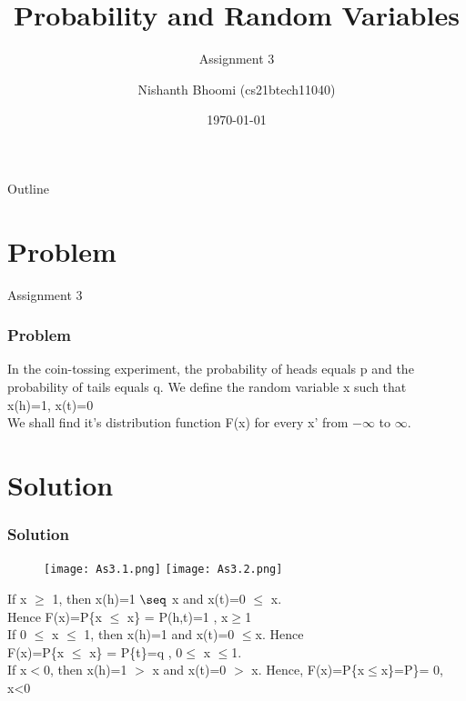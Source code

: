 \documentclass{beamer}
\title{Probability and Random Variables}
\subtitle{Assignment 3}
\author{Nishanth Bhoomi (cs21btech11040)}
\date{\today}
\begin{document}
\begin{frame}
    \titlepage 
\end{frame}

\begin{frame}{Outline}
    \tableofcontents
\end{frame}

\section{Problem}

\begin{frame}{Assignment 3}
  \frametitle{Problem}
 In the coin-tossing experiment, the probability of heads equals p and the probability of tails equals q. We define the random variable x such that\\
x(h)=1, x(t)=0\\
We shall find it's distribution function F(x) for every x' from $-\infty$ to $\infty$.\\

 \end{frame}
  
\section{Solution}
\begin{frame}

\frametitle{Solution}

\begin{figure}[h]
    \texttt{[image: As3.1.png]}
     \texttt{[image: As3.2.png]}
\end{figure}

If x $\geq$ 1, then x(h)=1 $\seq$ x and x(t)=0 $\leq$ x.\\
Hence F(x)=P\{x $\leq$ x\} = P(h,t)=1 , x$\geq$1 \\
If 0 $\leq$ x $\leq$ 1, then x(h)=1 and x(t)=0 $\leq$x. Hence\\
F(x)=P\{x $\leq$ x\} = P\{t\}=q , 0$\leq$ x $\leq$1.\\
If x$<$0, then x(h)=1 $>$ x and x(t)=0 $>$ x. Hence,
F(x)=P\{x$\leq$x\}=P\theta\}= 0, x<0
\end{frame}
\end{document}
